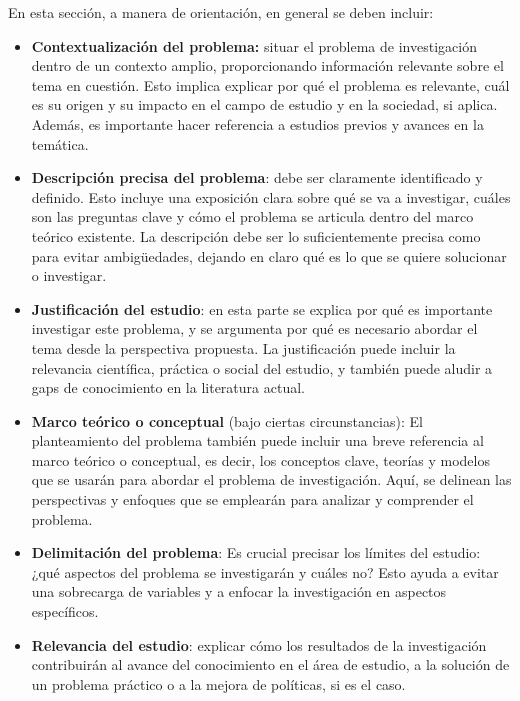 \documentclass[a4paper,12pt]{article}
\begin{document}
En esta sección, a manera de orientación, en general se deben incluir:
\begin{itemize}
	\item \textbf{Contextualización del problema:} situar el problema de investigación dentro de un contexto amplio, proporcionando información relevante sobre el tema en cuestión. Esto implica explicar por qué el problema es relevante, cuál es su origen y su impacto en el campo de estudio y en la sociedad, si aplica. Además, es importante hacer referencia a estudios previos y avances en la temática.
\end{itemize}
\begin{itemize}
	\item \textbf{Descripción precisa del problema}: debe ser claramente identificado y definido. Esto incluye una exposición clara sobre qué se va a investigar, cuáles son las preguntas clave y cómo el problema se articula dentro del marco teórico existente. La descripción debe ser lo suficientemente precisa como para evitar ambigüedades, dejando en claro qué es lo que se quiere solucionar o investigar.
\end{itemize}
\begin{itemize}
	\item \textbf{Justificación del estudio}: en esta parte se explica por qué es importante investigar este problema, y se argumenta por qué es necesario abordar el tema desde la perspectiva propuesta. La justificación puede incluir la relevancia científica, práctica o social del estudio, y también puede aludir a gaps de conocimiento en la literatura actual.
\end{itemize}

\begin{itemize}
	\item\textbf{ Marco teórico o conceptual }(bajo ciertas circunstancias): El planteamiento del problema también puede incluir una breve referencia al marco teórico o conceptual, es decir, los conceptos clave, teorías y modelos que se usarán para abordar el problema de investigación. Aquí, se delinean las perspectivas y enfoques que se emplearán para analizar y comprender el problema.
\end{itemize}
\begin{itemize}
	\item \textbf{Delimitación del problema}: Es crucial precisar los límites del estudio: ¿qué aspectos del problema se investigarán y cuáles no? Esto ayuda a evitar una sobrecarga de variables y a enfocar la investigación en aspectos específicos.
\end{itemize}
\begin{itemize}
	\item \textbf{Relevancia del estudio}: explicar cómo los resultados de la investigación contribuirán al avance del conocimiento en el área de estudio, a la solución de un problema práctico o a la mejora de políticas, si es el caso.
\end{itemize}
\end{document}
